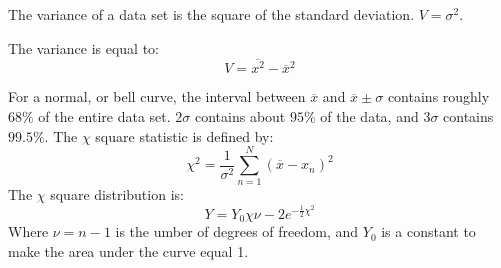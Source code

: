 \documentclass[crop=false,class=book,oneside]{standalone}
\begin{document}
        \begin{definition}
            The variance of a data set is the square of the
            standard deviation. $V=\sigma^{2}$.
        \end{definition}
        \begin{theorem}
            The variance is equal to:
            \begin{equation*}
                V=\overline{x^{2}}-\overline{x}^{2}
            \end{equation*}
        \end{theorem}
        For a normal, or bell curve, the interval between
        $\overline{x}$ and $\overline{x}\pm\sigma$ contains
        roughly $68\%$ of the entire data set. $2\sigma$
        contains about $95\%$ of the data, and
        $3\sigma$ contains $99.5\%$.
        The $\chi$ square statistic is defined by:
        \begin{equation*}
            \chi^{2}=\frac{1}{\sigma^{2}}
                \sum_{n=1}^{N}(\overline{x}-x_{n})^{2}
        \end{equation*}
        The $\chi$ square distribution is:
        \begin{equation*}
            Y=Y_{0}\chi{\nu-2}e^{-\frac{1}{2}\chi^{2}}
        \end{equation*}
        Where $\nu=n-1$ is the umber of degrees of freedom,
        and $Y_{0}$ is a constant to make the area under the
        curve equal 1.
\end{document}
